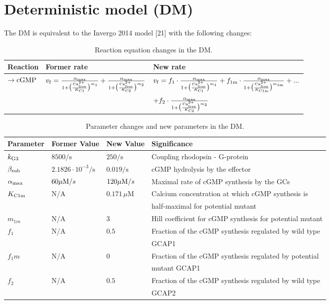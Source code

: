 \documentclass[a4paper, 12pt]{book}
\begin{document}
\pagestyle{empty}

\section*{Deterministic model (DM)}

The DM is equivalent to the Invergo 2014 model [21] with the following changes:

\begin{table}[H]
\centering
\caption{Reaction equation changes in the DM.}
\label{tab_det_model}
\begin{tabular}{l | l | l}
Reaction & Former rate & New rate\\
\hline
\hline
$\rightarrow {\rm cGMP}$ & $v_{\rm f} = \frac{\alpha_{\rm max}}{1 + \bigl( \frac{{\rm Ca}^{2+}_{\rm free}}{K_{\rm C1}} \bigr)^{m_1}  } + \frac{\alpha_{\rm max}}{1 + \bigl( \frac{{\rm Ca}^{2+}_{\rm free}}{K_{\rm C2}} \bigr)^{m_2}  }  $ & $v_{\rm f} = f_1 \cdot \frac{\alpha_{\rm max}}{1+\bigl( \frac{{\rm Ca}^{2+}_{\rm free}}{K_{\rm C1}}\bigr)^{m_1}} + f_{\rm 1m} \cdot \frac{\alpha_{\rm max}}{1+\bigl( \frac{{\rm Ca}^{2+}_{\rm free}}{K_{\rm C1m}}\bigr)^{m_{\rm 1m}}} + ...$\\
 & & $ + f_2 \cdot \frac{\alpha_{\rm max}}{1+\bigl( \frac{{\rm Ca}^{2+}_{\rm free}}{K_{\rm C2}}\bigr)^{m_2}}$
\end{tabular}
\end{table}

\begin{table}[H]
\centering
\caption{Parameter changes and new parameters in the DM.}
\label{tab_det_model}
\begin{tabular}{l | l | l | l}
Parameter & Former Value & New Value & Significance\\
\hline
\hline
$k_{\rm G3}$ & $8500/\mathrm{s}$ & $250/\mathrm{s}$ & Coupling rhodopsin - G-protein\\
\hline
$\beta_{\rm sub}$ & $2.1826 \cdot 10^{-3}/\mathrm{s}$ & $0.019/\mathrm{s}$ & cGMP hydrolysis by the effector\\
\hline
$\alpha_{\rm max}$ & $60 \mu {\rm M}/s$ & $120 \mu {\rm M}/s$ & Maximal rate of cGMP synthesis by the GCs\\
\hline
$K_{\rm C1m}$ & N/A & $ 0.171\,\mu\mathrm{M}$ & Calcium concentration at which cGMP synthesis is\\
 & & &  half-maximal for potential mutant\\
\hline
$m_{1m}$ & N/A & $3$ & Hill coefficient for cGMP synthesis for potential mutant\\
\hline
$f_1$ & N/A & $0.5$ & Fraction of the cGMP synthesis regulated by wild type\\
 & & & GCAP1\\
\hline
$f_1m$ & N/A & $0$ & Fraction of the cGMP synthesis regulated by potential\\
 & & & mutant GCAP1\\
\hline
$f_2$ & N/A & $0.5$ & Fraction of the cGMP synthesis regulated by wild type\\
 & & & GCAP2\\
\end{tabular}
\end{table}
\end{document}
